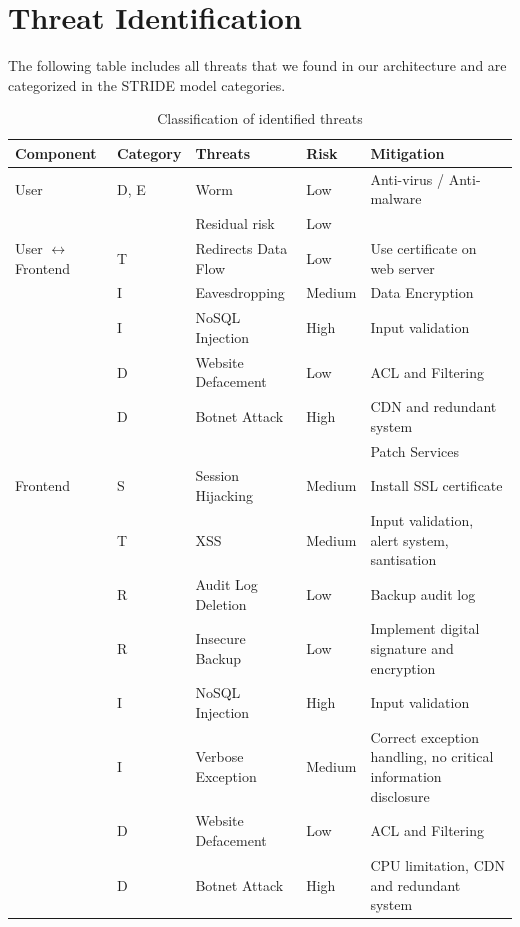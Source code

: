 \section{Threat Identification}
The following table includes all threats that we found in our architecture and are categorized in the STRIDE model categories.
\begin{longtable}[h!]{p{2.1cm} p{1.8cm} p{3cm} p{2cm} p{3.5cm}}
    \textbf{Component} & \textbf{Category} & \textbf{Threats} & \textbf{Risk} & \textbf{Mitigation} \\ \hline
    \endhead
    \caption{\label{tab:threats-classification}Classification of identified threats}
    \endlastfoot
    User                & D, E & Worm & Low & Anti-virus / Anti-malware\\
                        & & Residual risk & Low & \\
    \hline
    User \(\leftrightarrow\) Frontend   
                        & T & Redirects Data Flow & Low & Use certificate on web server \\ 
                        & I & Eavesdropping & Medium & Data Encryption \\
                        & I & NoSQL Injection & High & Input validation \\
                        & D & Website Defacement & Low & ACL and Filtering \\
                        & D & Botnet Attack & High & CDN and redundant system \\
                        & & & & Patch Services \\
    \hline
    Frontend            & S & Session Hijacking & Medium & Install SSL certificate \\
                        & T & XSS & Medium & Input validation, alert system, santisation \\
                        & R & Audit Log Deletion & Low & Backup audit log \\
                        & R & Insecure Backup & Low & Implement digital signature and encryption \\
                        & I & NoSQL Injection & High & Input validation \\
                        & I & Verbose Exception & Medium & Correct exception handling, no critical information disclosure \\
                        & D & Website Defacement & Low & ACL and Filtering \\
                        & D & Botnet Attack & High & CPU limitation, CDN and redundant system \\

\end{longtable}
